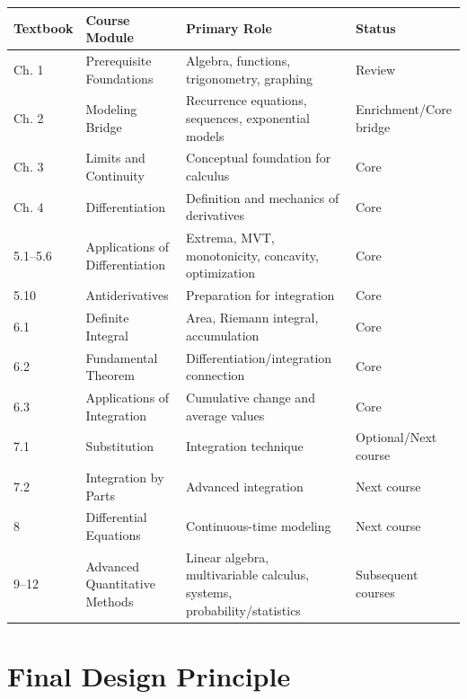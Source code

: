 \documentclass[11pt]{article}
\begin{document}
\begin{longtable}{p{2.3cm}p{4.0cm}p{6.3cm}p{2.2cm}}
\toprule
\textbf{Textbook} & \textbf{Course Module} & \textbf{Primary Role}
& \textbf{Status} \\
\midrule

Ch. 1
& Prerequisite Foundations
& Algebra, functions, trigonometry, graphing
& Review \\

Ch. 2
& Modeling Bridge
& Recurrence equations, sequences, exponential models
& Enrichment/Core bridge \\

Ch. 3
& Limits and Continuity
& Conceptual foundation for calculus
& Core \\

Ch. 4
& Differentiation
& Definition and mechanics of derivatives
& Core \\

5.1--5.6
& Applications of Differentiation
& Extrema, MVT, monotonicity, concavity, optimization
& Core \\

5.10
& Antiderivatives
& Preparation for integration
& Core \\

6.1
& Definite Integral
& Area, Riemann integral, accumulation
& Core \\

6.2
& Fundamental Theorem
& Differentiation/integration connection
& Core \\

6.3
& Applications of Integration
& Cumulative change and average values
& Core \\

7.1
& Substitution
& Integration technique
& Optional/Next course \\

7.2
& Integration by Parts
& Advanced integration
& Next course \\

8
& Differential Equations
& Continuous-time modeling
& Next course \\

9--12
& Advanced Quantitative Methods
& Linear algebra, multivariable calculus, systems, probability/statistics
& Subsequent courses \\

\bottomrule
\end{longtable}

\section*{Final Design Principle}
\end{document}

